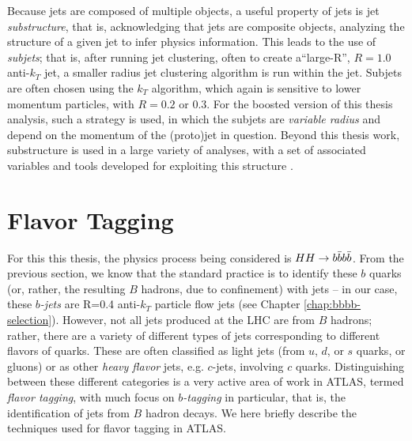 Because jets are composed of multiple objects, a useful property of jets is jet \emph{substructure}, that is, 
acknowledging that jets are composite objects, analyzing the structure of a given jet to infer physics information. 
This leads to the use of \emph{subjets}; that is, after running jet clustering, often to create a``large-R'', $R=1.0$ 
anti-$k_{T}$ jet, a smaller radius jet clustering algorithm is run within the jet. Subjets are often chosen using the 
$k_{T}$ algorithm, which again is sensitive to lower momentum particles, with $R=0.2$ or 0.3. For the boosted version 
of this thesis analysis, such a strategy is used, in which the subjets are \emph{variable radius} and depend on the 
momentum of the (proto)jet in question. Beyond this thesis work, substructure is used in a large variety of analyses, 
with a set of associated variables and tools developed for exploiting this structure .
 
\section{Flavor Tagging}
For this this thesis, the physics process being considered is $HH\rightarrow b\bar{b}b\bar{b}$. From the previous section, we 
know that the standard practice is to identify these $b$ quarks (or, rather, the resulting $B$ hadrons, due to confinement) 
with jets -- in our case, these \emph{$b$-jets} are R=0.4 anti-$k_{T}$ particle flow jets (see Chapter \ref{chap:bbbb-selection}). 
However, not all jets produced at the LHC are from $B$ hadrons; rather, there are a variety of different types of jets 
corresponding to different flavors of quarks. These are often classified as light jets (from $u$, $d$, or $s$ quarks, or 
gluons) or as other \emph{heavy flavor} jets, e.g. $c$-jets, involving $c$ quarks. Distinguishing between these different 
categories is a very active area of work in ATLAS, termed \emph{flavor tagging}, with much focus on \emph{$b$-tagging} in 
particular, that is, the identification of jets from $B$ hadron decays. We here briefly describe the techniques used 
for flavor tagging in ATLAS.

